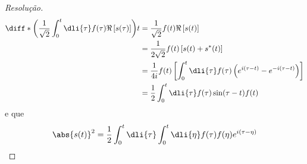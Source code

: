 \begin{proof}[Resolução]
\begin{align*}
      \diff*{\left(\frac1{\sqrt{2}} \int_0^t \dli{\tau} f(\tau) \Re\left[s(\tau)\right]\right)}{t} 
      &= \frac{1}{\sqrt{2}} f(t) \Re\left[s(t)\right]\\
      &= \frac{1}{2\sqrt{2}} f(t) \left[s(t) + s^*(t)\right]\\
      &= \frac{1}{4i} f(t) \left[\int_0^t \dli{\tau} f(\tau) \left(e^{i(\tau-t)} - e^{-i(\tau-t)}\right)\right]\\
      &= \frac12 \int_0^t \dli{\tau}f(\tau) \sin(\tau - t) f(t)
   \end{align*}
   e que
   \begin{equation*}
      \abs{s(t)}^2 = \frac12 \int_0^t \dli{\tau} \int_0^t \dli{\eta} f(\tau) f(\eta) e^{i(\tau - \eta)}
   \end{equation*}
\end{proof}
